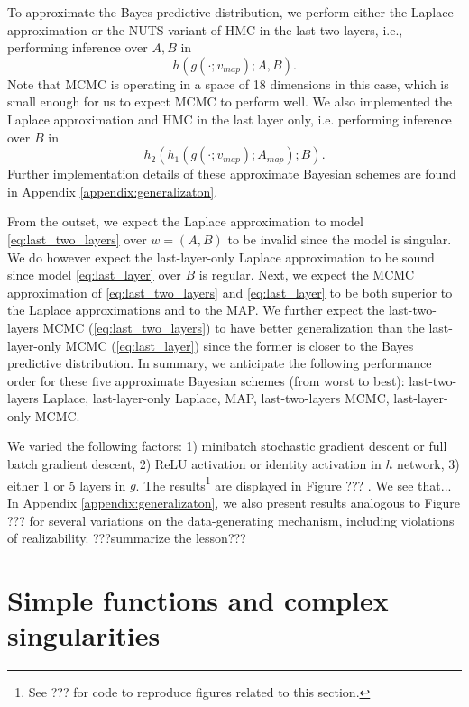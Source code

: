 \documentclass{article} %
\begin{document}
To approximate the Bayes predictive distribution, we perform either the Laplace approximation or the NUTS variant of HMC \citep{hoffman2014no} in the last two layers, i.e., performing inference over $A,B$ in
\begin{equation}
h(g(\cdot;v_{map});A,B).
\label{eq:last_two_layers}
\end{equation}
Note that MCMC is operating in a space of 18 dimensions in this case, which is small enough for us to expect MCMC to perform well.
We also implemented the Laplace approximation and HMC in the last layer only, i.e. performing inference over $B$ in
\begin{equation}
h_2(h_1(g(\cdot;v_{map});A_{map}); B).
\label{eq:last_layer}
\end{equation}
Further implementation details of these approximate Bayesian schemes are found in Appendix \ref{appendix:generalizaton}.

From the outset, we expect the Laplace approximation to model \ref{eq:last_two_layers} over $w = (A, B)$ to be invalid since the model is singular. We do however expect the last-layer-only Laplace approximation to be sound since model \ref{eq:last_layer} over $B$ is regular. Next, we expect the MCMC approximation of \eqref{eq:last_two_layers} and \eqref{eq:last_layer} to be both superior to the Laplace approximations and to the MAP. We further expect the last-two-layers MCMC (\eqref{eq:last_two_layers}) to have better generalization than the last-layer-only MCMC (\eqref{eq:last_layer}) since the former is closer to the Bayes predictive distribution. In summary, we anticipate the following performance order for these five approximate Bayesian schemes (from worst to best): last-two-layers Laplace, last-layer-only Laplace, MAP, last-two-layers MCMC, last-layer-only MCMC.


We varied the following factors: 1) minibatch stochastic gradient descent or full batch gradient descent, 2) ReLU activation or identity activation in $h$ network, 3) either 1 or 5 layers in $g$. 
The results\footnote{See ??? for code to reproduce figures related to this section.} are displayed in Figure ??? . We see that...
In Appendix \ref{appendix:generalizaton}, we also present results analogous to Figure ??? for several variations on the data-generating mechanism, including violations of realizability. ???summarize the lesson???


\section{Simple functions and complex singularities}\label{section:simple_func}
\end{document}
